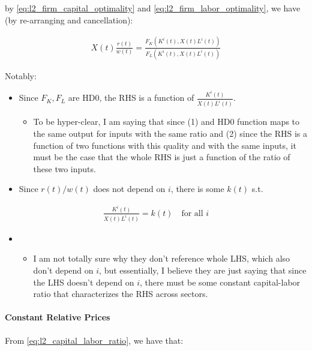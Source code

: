 \documentclass[10pt]{article}
\begin{document}
by \eqref{eq:l2_firm_capital_optimality} and \eqref{eq:l2_firm_labor_optimality},
we have (by re-arranging and cancellation):

\begin{align}
    X(t) \frac{r(t)}{w(t)}=\frac{F_K\left(K^i(t), X(t) L^i(t)\right)}{F_L\left(K^i(t), X(t) L^i(t)\right)}
\end{align}

Notably:

\begin{itemize}
    \item Since $F_K, F_L$ are HD0, the RHS is a function of $\frac{K^i(t)}{X(t) L^i(t)}$.
        \begin{itemize}
            \item To be hyper-clear, I am saying that since (1) and HD0 
            function maps to the same output for inputs with the same ratio 
            and (2) since the RHS is a function of two functions with this quality 
            and with the same 
            inputs, it must be the case that the whole RHS is 
            just a function of the ratio of these two inputs.
        \end{itemize}
    \item Since $r(t) / w(t)$ does not depend on $i$, there is some $k(t)$ s.t.
\end{itemize}
\begin{align}
    \frac{K^i(t)}{X(t) L^i(t)}=k(t) \quad \text{for all $i$} \label{eq:l2_capital_labor_ratio}
\end{align}
\begin{itemize}
    \item[]
        \begin{itemize}
            \item I am not totally sure why they don't reference whole LHS,
            which also don't depend on $i$, but essentially, I believe they 
            are just saying that since the LHS doesn't depend on $i$,
            there must be some constant capital-labor ratio that characterizes 
            the RHS across sectors.
        \end{itemize}
\end{itemize}

\paragraph{Constant Relative Prices}

From \eqref{eq:l2_capital_labor_ratio}, we have that:
\end{document}
